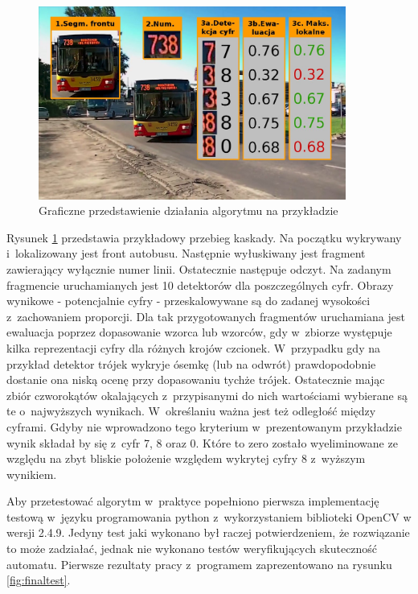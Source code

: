 \begin{figure}[!h]
    \centering
    \includegraphics[width=0.9\textwidth]{img/exp_alg_explanation}
    \caption{Graficzne przedstawienie działania algorytmu na przykładzie}
    \label{fig:algexp}
\end{figure}

Rysunek \ref{fig:algexp} przedstawia przykładowy przebieg kaskady. 
Na początku wykrywany i~lokalizowany jest front autobusu.
Następnie wyłuskiwany jest fragment zawierający wyłącznie numer linii.
Ostatecznie następuje odczyt. Na zadanym fragmencie uruchamianych jest
10 detektorów dla poszczególnych cyfr. Obrazy wynikowe - potencjalnie
cyfry - przeskalowywane są do zadanej wysokości z~zachowaniem proporcji.
Dla tak przygotowanych fragmentów uruchamiana jest ewaluacja poprzez
dopasowanie wzorca lub wzorców, gdy w~zbiorze występuje kilka
reprezentacji cyfry dla różnych krojów czcionek. W~przypadku
gdy na przykład detektor trójek
wykryje ósemkę (lub na odwrót) prawdopodobnie dostanie ona niską
ocenę przy dopasowaniu tychże trójek. Ostatecznie mając
zbiór czworokątów okalających z~przypisanymi do nich wartościami
wybierane są te o~najwyższych wynikach. W~określaniu ważna jest też
odległość między cyframi. Gdyby nie wprowadzono tego kryterium
w~prezentowanym przykładzie wynik składał by się z~cyfr 7, 8 oraz 0.
Które to zero zostało wyeliminowane ze względu na zbyt bliskie położenie
względem wykrytej cyfry 8 z~wyższym wynikiem.

Aby przetestować algorytm w~praktyce
popełniono pierwsza implementację testową w~języku programowania
python z~wykorzystaniem biblioteki OpenCV w wersji 2.4.9.
Jedyny test jaki wykonano był raczej potwierdzeniem, że
rozwiązanie to może zadziałać, jednak nie wykonano testów
weryfikujących skuteczność automatu. Pierwsze rezultaty
pracy z~programem zaprezentowano na rysunku \ref{fig:finaltest}.

